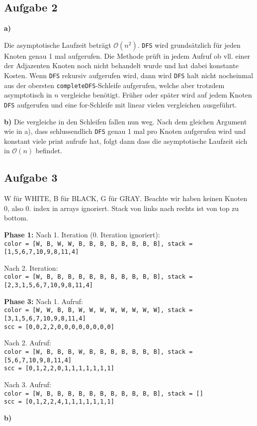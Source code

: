 \documentclass[a4paper,graphics,11pt]{article}
\newcommand{\aufgabe}[1]{\subsection*{Aufgabe #1}}
\begin{document}
\aufgabe{2}
\textbf{a)}

Die asymptotische Laufzeit beträgt $\mathcal{O}(n^2)$. \texttt{DFS} wird grundsätzlich für jeden Knoten
genau 1 mal aufgerufen. Die Methode prüft in jedem Aufruf ob vll. einer der Adjazenten Knoten noch nicht behandelt
wurde und hat dabei konstante Kosten. Wenn \texttt{DFS} rekursiv aufgerufen wird, dann wird \texttt{DFS} halt
nicht nocheinmal aus der obersten \texttt{completeDFS}-Schleife aufgerufen, welche aber trotzdem asymptotisch
in $n$ vergleiche benötigt. Früher oder später wird auf jedem Knoten \texttt{DFS} aufgerufen und eine
for-Schleife mit linear vielen vergleichen ausgeführt.

\textbf{b)}
Die vergleiche in den Schleifen fallen nun weg. Nach dem gleichen Argument wie in a), dass schlussendlich
\texttt{DFS} genau 1 mal pro Knoten aufgerufen wird und konstant viele print aufrufe hat, folgt dann
dass die asymptotische Laufzeit sich in $\mathcal{O}(n)$ befindet.

\aufgabe{3}
W für WHITE, B für BLACK, G für GRAY. Beachte wir haben keinen Knoten 0, also 0. index in arrays ignoriert.
Stack von links nach rechts ist von top zu bottom.

\textbf{Phase 1:}
Nach 1. Iteration (0. Iteration ignoriert):\\
\texttt{color = [W, B, W, W, B, B, B, B, B, B, B, B], stack = [1,5,6,7,10,9,8,11,4]}
\newpage

Nach 2. Iteration:\\
\texttt{color = [W, B, B, B, B, B, B, B, B, B, B, B], stack = [2,3,1,5,6,7,10,9,8,11,4]}

\textbf{Phase 3:}
Nach 1. Aufruf:\\
\texttt{color = [W, W, B, B, W, W, W, W, W, W, W, W], stack = [3,1,5,6,7,10,9,8,11,4]}\\
\texttt{scc = [0,0,2,2,0,0,0,0,0,0,0,0]}

Nach 2. Aufruf:\\
\texttt{color = [W, B, B, B, W, B, B, B, B, B, B, B], stack = [5,6,7,10,9,8,11,4]}\\
\texttt{scc = [0,1,2,2,0,1,1,1,1,1,1,1]}

Nach 3. Aufruf:\\
\texttt{color = [W, B, B, B, B, B, B, B, B, B, B, B], stack = []}\\
\texttt{scc = [0,1,2,2,4,1,1,1,1,1,1,1]}

\textbf{b)}
\begin{center}
\end{center}
\end{document}
